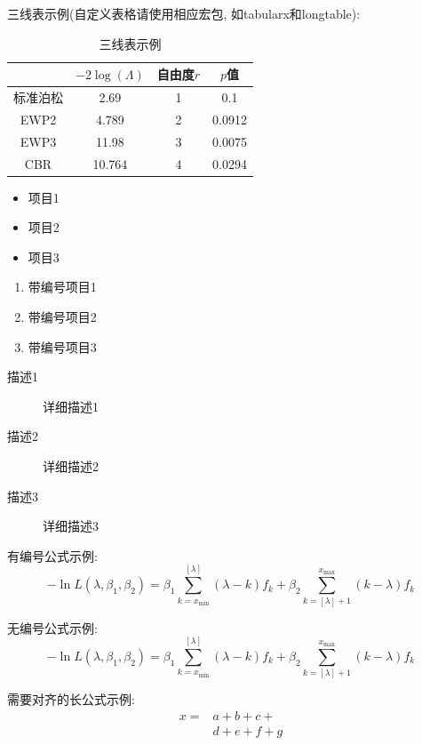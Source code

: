 \documentclass{cosart}
\begin{document}
三线表示例(自定义表格请使用相应宏包, 如tabularx和longtable):
\begin{table}[htbp]
  \centering
  \caption{三线表示例} \label{tab1}
    \begin{tabular}{cccc}
    \toprule
              & $-2\log(\Lambda)$ & 自由度$r$ & $p$值 \\
    \midrule
    标准泊松  & 2.69   & 1     & 0.1    \\
    EWP2      & 4.789  & 2     & 0.0912 \\
    EWP3      & 11.98  & 3     & 0.0075 \\
    CBR       & 10.764 & 4     & 0.0294 \\
    \bottomrule
    \end{tabular}
\end{table}

\begin{itemize}
  \item 项目1
  \item 项目2
  \item 项目3
\end{itemize}

\begin{enumerate}
  \item 带编号项目1
  \item 带编号项目2
  \item 带编号项目3
\end{enumerate}

\begin{description}
  \item[描述1] 详细描述1
  \item[描述2] 详细描述2
  \item[描述3] 详细描述3
\end{description}

有编号公式示例:
\begin{equation}\label{eqn_a}
  -\ln L(\lambda, \beta_1, \beta_2)=\beta_1\sum^{[\lambda]}_{k=x_{\min}}(\lambda-k) f_k+
\beta_2\sum^{x_{\max}}_{k=[\lambda]+1}(k-\lambda) f_k
\end{equation}

无编号公式示例:
\begin{equation*}\label{eqn_b}
  -\ln L(\lambda, \beta_1, \beta_2)=\beta_1\sum^{[\lambda]}_{k=x_{\min}}(\lambda-k) f_k+
\beta_2\sum^{x_{\max}}_{k=[\lambda]+1}(k-\lambda) f_k
\end{equation*}

需要对齐的长公式示例:
\[ \begin{split}
x=&a+b+c+\\
&d+e+f+g
\end{split} \]
\end{document}
